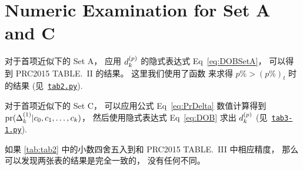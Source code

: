 
\section{Numeric Examination for Set A and C}
对于首项近似下的 Set A，
应用 $d_k^{(p)}$ 的隐式表达式 Eq~\eqref{eq:DOBSetA}，
可以得到 PRC2015 TABLE.~II 的结果。
这里我们使用了函数 
来求得 $p\%>(p\%)_t$ 时的结果
(见~\href{https://github.com/Dou-Meishi/bayesforerror/blob/master/code/tab2.py}{\texttt{tab2.py}}).

对于首项近似下的 Set C，
可以应用公式 Eq~\eqref{eq:PrDelta} 数值计算得到 $\textrm{pr}(\Delta_k^{(1)}|
c_0,c_1,\ldots,c_k)$，
然后使用隐式表达式 Eq~\eqref{eq:DOB} 求出 $d_k^{(p)}$
(见~\href{https://github.com/Dou-Meishi/bayesforerror/blob/master/code/tab3-1.py}{\texttt{tab3-1.py}}).

如果 \autoref{tab:tab2} 中的小数四舍五入到和 PRC2015 TABLE.~III 中相应精度，
那么可以发现两张表的结果是完全一致的，
没有任何不同。
